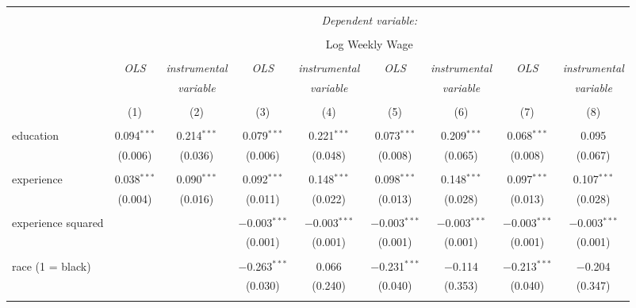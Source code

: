 
\begin{sidewaystable}[!htbp] \centering 
  \caption{} 
  \label{} 
\begin{tabular}{@{\extracolsep{5pt}}lcccccccc} 
\\[-1.8ex]\hline 
\hline \\[-1.8ex] 
 & \multicolumn{8}{c}{\textit{Dependent variable:}} \\ 
\cline{2-9} 
\\[-1.8ex] & \multicolumn{8}{c}{Log Weekly Wage} \\ 
\\[-1.8ex] & \textit{OLS} & \textit{instrumental} & \textit{OLS} & \textit{instrumental} & \textit{OLS} & \textit{instrumental} & \textit{OLS} & \textit{instrumental} \\ 
 & \textit{} & \textit{variable} & \textit{} & \textit{variable} & \textit{} & \textit{variable} & \textit{} & \textit{variable} \\ 
\\[-1.8ex] & (1) & (2) & (3) & (4) & (5) & (6) & (7) & (8)\\ 
\hline \\[-1.8ex] 
 education & 0.094$^{***}$ & 0.214$^{***}$ & 0.079$^{***}$ & 0.221$^{***}$ & 0.073$^{***}$ & 0.209$^{***}$ & 0.068$^{***}$ & 0.095 \\ 
  & (0.006) & (0.036) & (0.006) & (0.048) & (0.008) & (0.065) & (0.008) & (0.067) \\ 
  & & & & & & & & \\ 
 experience & 0.038$^{***}$ & 0.090$^{***}$ & 0.092$^{***}$ & 0.148$^{***}$ & 0.098$^{***}$ & 0.148$^{***}$ & 0.097$^{***}$ & 0.107$^{***}$ \\ 
  & (0.004) & (0.016) & (0.011) & (0.022) & (0.013) & (0.028) & (0.013) & (0.028) \\ 
  & & & & & & & & \\ 
 experience squared &  &  & $-$0.003$^{***}$ & $-$0.003$^{***}$ & $-$0.003$^{***}$ & $-$0.003$^{***}$ & $-$0.003$^{***}$ & $-$0.003$^{***}$ \\ 
  &  &  & (0.001) & (0.001) & (0.001) & (0.001) & (0.001) & (0.001) \\ 
  & & & & & & & & \\ 
 race (1 = black) &  &  & $-$0.263$^{***}$ & 0.066 & $-$0.231$^{***}$ & $-$0.114 & $-$0.213$^{***}$ & $-$0.204 \\ 
  &  &  & (0.030) & (0.240) & (0.040) & (0.353) & (0.040) & (0.347) \\ 
  & & & & & & & & \\ 

\end{tabular}
\end{sidewaystable}
